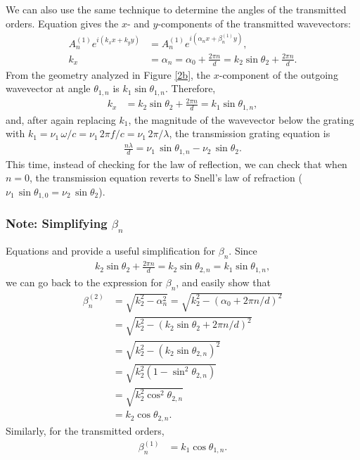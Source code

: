 We can also use the same technique to determine the angles of the transmitted orders.  Equation  gives the $x$- and $y$-components of the transmitted wavevectors:
\begin{align}
A^{(1)}_n e^{i(k_x x + k_y y)} &= A^{(1)}_n e^{i(\alpha_n x + \beta^{(1)}_n y)}, \\
k_x &= \alpha_n = \alpha_0 + \frac{ 2\pi n}{d} = k_2 \sin \theta_2 +\frac{ 2\pi n}{d}.
\end{align}
From the geometry analyzed in Figure \ref{2b}, the $x$-component of the outgoing wavevector at angle $\theta_{1,n}$ is $k_1 \sin \theta_{1,n}$.  Therefore,
\begin{align}
\label{kxEqn1}
k_x &= k_2 \sin \theta_2 +\frac{ 2\pi n}{d} = k_1 \sin \theta_{1,n},
\end{align}
and, after again replacing $k_1$, the magnitude of the wavevector below the grating with $k_1 = \nu_1\, \omega / c = \nu_1 \, 2\pi f / c =  \nu_1 \, 2\pi / \lambda$, the transmission grating equation is
\begin{align}
\label{gratingEquation}
\frac{n \lambda}{d} = \nu_1 \, \sin \theta_{1,n} -  \nu_2 \, \sin \theta_{2}.
\end{align}
This time, instead of checking for the law of reflection, we can check that when $n=0$, the transmission equation reverts to Snell's law of refraction ($\nu_1\, \sin \theta_{1,0} = \nu_2 \, \sin \theta_2$).

\subsubsection{Note: Simplifying $\beta_n$}
Equations  and  provide a useful simplification for $\beta_n$.  Since 
\begin{align}
k_2 \sin \theta_2 +\frac{ 2\pi n}{d} = k_2 \sin \theta_{2,n} = k_1 \sin \theta_{1,n},
\end{align}
we can go back to the expression for $\beta_n$, and easily show that 
\begin{align}
\beta_n^{(2)} &= \sqrt{k_2^2 - \alpha_n^2} = \sqrt{k_2^2 - (\alpha_0 +2\pi n/d)^2} \\
&= \sqrt{k_2^2 - (k_2 \sin \theta_2 +2\pi n/d)^2}\\
&= \sqrt{ k_2^2 - (k_2 \sin \theta_{2,n})^2 }\\
&= \sqrt{ k_2^2 (1 - \sin^2 \theta_{2,n})}\\
&= \sqrt{ k_2^2 \cos^2 \theta_{2,n} }\\
&= k_2 \cos \theta_{2,n}.
\end{align}
Similarly, for the transmitted orders,
\begin{align}
\beta_n^{(1)} &= k_1 \cos \theta_{1,n}.
\end{align}

